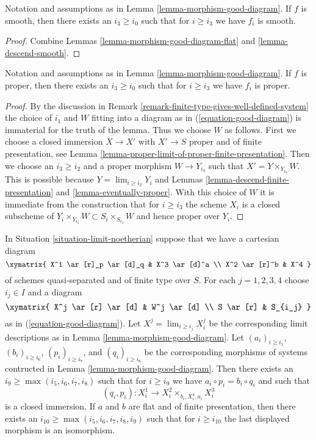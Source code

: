 \begin{lemma}
\label{lemma-morphism-good-diagram-smooth}
Notation and assumptions as in Lemma \ref{lemma-morphism-good-diagram}.
If $f$ is smooth, then there exists an $i_3 \geq i_0$ such that for
$i \geq i_3$ we have $f_i$ is smooth.
\end{lemma}

\begin{proof}
Combine Lemmas \ref{lemma-morphism-good-diagram-flat} and
\ref{lemma-descend-smooth}.
\end{proof}

\begin{lemma}
\label{lemma-morphism-good-diagram-proper}
Notation and assumptions as in Lemma \ref{lemma-morphism-good-diagram}.
If $f$ is proper, then there exists an $i_3 \geq i_0$ such that for
$i \geq i_3$ we have $f_i$ is proper.
\end{lemma}

\begin{proof}
By the discussion in 
Remark \ref{remark-finite-type-gives-well-defined-system}
the choice of $i_1$ and $W$ fitting into a diagram as in
(\ref{equation-good-diagram}) is immaterial for the truth of
the lemma. Thus we choose $W$ as follows.
First we choose a closed immersion $X \to X'$
with $X' \to S$ proper and of finite presentation, see
Lemma \ref{lemma-proper-limit-of-proper-finite-presentation}.
Then we choose an $i_3 \geq i_2$ and a proper morphism $W \to Y_{i_3}$
such that $X' = Y \times_{Y_{i_3}} W$. This is possible because
$Y = \lim_{i \geq i_2} Y_i$ and
Lemmas \ref{lemma-descend-finite-presentation} and
\ref{lemma-eventually-proper}.
With this choice of $W$ it is immediate from the construction that
for $i \geq i_3$ the scheme $X_i$ is a closed subscheme of
$Y_i \times_{Y_{i_3}} W \subset S_i \times_{S_{i_3}} W$
and hence proper over $Y_i$.
\end{proof}

\begin{lemma}
\label{lemma-good-diagram-fibre-product}
In Situation \ref{situation-limit-noetherian} suppose that we have a
cartesian diagram
$$
\xymatrix{
X^1 \ar[r]_p \ar[d]_q & X^3 \ar[d]^a \\
X^2 \ar[r]^b & X^4
}
$$
of schemes quasi-separated and of finite type over $S$.
For each $j = 1, 2, 3, 4$ choose $i_j \in I$ and a diagram
$$
\xymatrix{
X^j \ar[r] \ar[d] & W^j \ar[d] \\
S \ar[r] & S_{i_j}
}
$$
as in (\ref{equation-good-diagram}). Let
$X^j = \lim_{i \geq i_j} X^j_i$ be the corresponding limit descriptions
as in Lemma \ref{lemma-morphism-good-diagram}.
Let $(a_i)_{i \geq i_5}$, $(b_i)_{i \geq i_6}$, $(p_i)_{i \geq i_7}$, and
$(q_i)_{i \geq i_8}$ be the corresponding morphisms of systems contructed
in Lemma \ref{lemma-morphism-good-diagram}. Then there exists an
$i_9 \geq \max(i_5, i_6, i_7, i_8)$ such that for $i \geq i_9$ we have
$a_i \circ p_i = b_i \circ q_i$ and such that
$$
(q_i, p_i) : X^1_i \longrightarrow X^2_i \times_{b_i, X^4_i, a_i} X^3_i
$$
is a closed immersion.
If $a$ and $b$ are flat and of finite presentation, then there exists an
$i_{10} \geq \max(i_5, i_6, i_7, i_8, i_9)$ such that for $i \geq i_{10}$
the last displayed morphism is an isomorphism.
\end{lemma}

